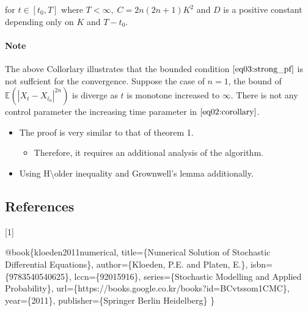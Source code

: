 \documentclass[]{article}
\newenvironment{Shaded}{}{}
\newcommand{\DataTypeTok}[1]{\textcolor[rgb]{0.56,0.13,0.00}{#1}}
\newcommand{\NormalTok}[1]{#1}
\newcommand{\OtherTok}[1]{\textcolor[rgb]{0.00,0.44,0.13}{#1}}
\newcommand{\VariableTok}[1]{\textcolor[rgb]{0.10,0.09,0.49}{#1}}
\let\oldparagraph\paragraph
\renewcommand{\paragraph}[1]{\oldparagraph{#1}\mbox{}}
\begin{document}
for \(t \in [t_0, T]\) where \(T < \infty, \; C = 2n (2n + 1) K^2\) and
\(D\) is a positive constant depending only on \(K\) and \(T - t_0\).

\hypertarget{header-n145}{%
\paragraph{Note}\label{header-n145}}

The above Collorlary illustrates that the bounded condition
\(\eqref{eq03:strong_pf}\) is not suffcient for the convergence. Suppose
the case of \(n=1\), the bound of
\(\mathbb{E}\left(  \left |X_t -  X_{t_0}  \right |^{2n} \right)\) is
diverge as \(t\) is monotone increased to \(\infty\). There is not any
control parameter the increasing time parameter in
\(\eqref{eq02:corollary}\).

\begin{itemize}
\item
  The proof is very similar to that of theorem 1.

  \begin{itemize}
  \item
    Therefore, it requires an additional analysis of the algorithm.
  \end{itemize}
\item
  Using H\textbackslash{}older inequality and Grownwell's lemma
  additionally. 
\end{itemize}

\hypertarget{header-n156}{%
\subsection{References}\label{header-n156}}

{[}1{]}

\begin{Shaded}
\begin{Highlighting}[]
\VariableTok{@book}\NormalTok{\{}\OtherTok{kloeden2011numerical}\NormalTok{,}
  \DataTypeTok{title}\NormalTok{=\{Numerical Solution of Stochastic Differential Equations\},}
  \DataTypeTok{author}\NormalTok{=\{Kloeden, P.E. and Platen, E.\},}
  \DataTypeTok{isbn}\NormalTok{=\{9783540540625\},}
  \DataTypeTok{lccn}\NormalTok{=\{92015916\},}
  \DataTypeTok{series}\NormalTok{=\{Stochastic Modelling and Applied Probability\},}
  \DataTypeTok{url}\NormalTok{=\{https://books.google.co.kr/books?id=BCvtssom1CMC\},}
  \DataTypeTok{year}\NormalTok{=\{2011\},}
  \DataTypeTok{publisher}\NormalTok{=\{Springer Berlin Heidelberg\}}
\NormalTok{\}}
\end{Highlighting}
\end{Shaded}
\end{document}
